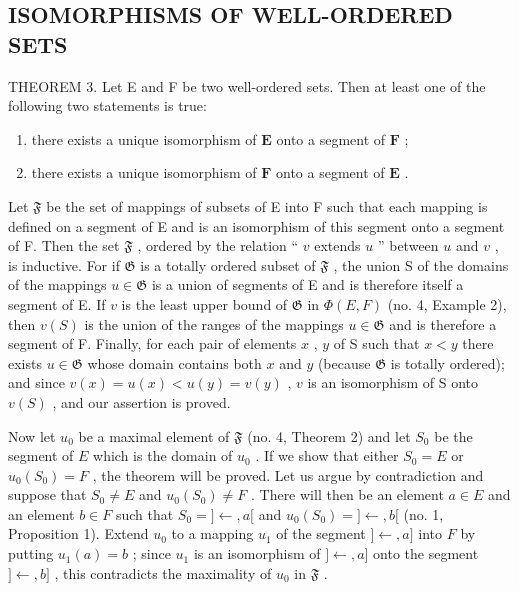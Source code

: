 \subsection{ISOMORPHISMS OF WELL-ORDERED SETS}

THEOREM 3. Let E and F be two well-ordered sets. Then at least one of the following two statements is true:

\begin{enumerate}
\def\labelenumi{(\arabic{enumi})}
\item
  there exists a unique isomorphism of \(\mathbf{E}\) onto a segment of \(\mathbf{F}\) ;
\item
  there exists a unique isomorphism of \(\mathbf{F}\) onto a segment of \(\mathbf{E}\) .
\end{enumerate}

Let \(\mathfrak{F}\) be the set of mappings of subsets of E into F such that each mapping is defined on a segment of E and is an isomorphism of this segment onto a segment of F. Then the set \(\mathfrak{F}\) , ordered by the relation `` \(v\) extends \(u\) '' between \(u\) and \(v\) , is inductive. For if \(\mathfrak{G}\) is a totally ordered subset of \(\mathfrak{F}\) , the union S of the domains of the mappings \(u \in \mathfrak{G}\) is a union of segments of E and is therefore itself a segment of E. If \(v\) is the least upper bound of \(\mathfrak{G}\) in \(\Phi(E, F)\) (no. 4, Example 2), then \(v(S)\) is the union of the ranges of the mappings \(u \in \mathfrak{G}\) and is therefore a segment of F. Finally, for each pair of elements \(x\) , \(y\) of S such that \(x < y\) there exists \(u \in \mathfrak{G}\) whose domain contains both \(x\) and \(y\) (because \(\mathfrak{G}\) is totally ordered); and since \(v(x) = u(x) < u(y) = v(y)\) , \(v\) is an isomorphism of S onto \(v(S)\) , and our assertion is proved.

Now let \(u_0\) be a maximal element of \(\mathfrak{F}\) (no. 4, Theorem 2) and let \(S_0\) be the segment of \(E\) which is the domain of \(u_0\) . If we show that either \(S_0 = E\) or \(u_0(S_0) = F\) , the theorem will be proved. Let us argue by contradiction and suppose that \(S_0 \neq E\) and \(u_0(S_0) \neq F\) . There will then be an element \(a \in E\) and an element \(b \in F\) such that \(S_0 = ]\leftarrow, a[\) and \(u_0(S_0) = ]\leftarrow, b[\) (no. 1, Proposition 1). Extend \(u_0\) to a mapping \(u_1\) of the segment \(]\leftarrow, a]\) into \(F\) by putting \(u_1(a) = b\) ; since \(u_1\) is an isomorphism of \(]\leftarrow, a]\) onto the segment \(]\leftarrow, b]\) , this contradicts the maximality of \(u_0\) in \(\mathfrak{F}\) .

